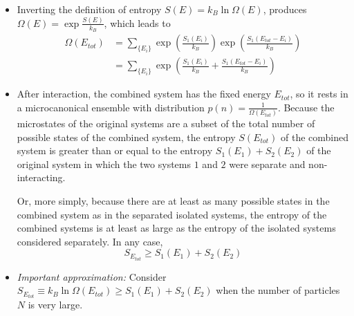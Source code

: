 \documentclass[11pt, a4paper]{article}
\begin{document}
\begin{itemize}
	\item Inverting the definition of entropy $ S(E) = k_{B}\ln \Omega(E) $, produces $ \Omega(E) = \exp \frac{S(E)}{k_{B}} $, which leads to 
	\begin{align*}
		\Omega(E_{tot}) &= \sum_{\{E_{i}\}} \exp(\frac{S_{1}(E_{i})}{k_{B}}) \exp(\frac{S_{1}(E_{tot} - E_{i})}{k_{B}}) \\
		& = \sum_{\{E_{i}\}} \exp(\frac{S_{1}(E_{i})}{k_{B}} + \frac{S_{1}(E_{tot} - E_{i})}{k_{B}})
	\end{align*}
	

	
	\item After interaction, the combined system has the fixed energy $ E_{tot} $, so it rests in a microcanonical ensemble with distribution $ p(n) = \frac{1}{\Omega(E_{tot})}$. Because the microstates of the original systems are a subset of the total number of possible states of the combined system, the entropy $ S(E_{tot}) $ of the combined system is greater than or equal to the entropy $ S_{1}(E_{1}) + S_{2}(E_{2}) $ of the original system in which the two systems $ 1 $ and $ 2 $ were separate and non-interacting.

	Or, more simply, because there are at least as many possible states in the combined system as in the separated isolated systems, the entropy of the combined systems is at least as large as the entropy of the isolated systems considered separately. In any case,
	\begin{equation*}
		S_{E_{tot}} \geq S_{1}(E_{1}) + S_{2}(E_{2})
	\end{equation*}
	
	\item \textit{Important approximation:} Consider $ S_{E_{tot}} \equiv k_{B}\ln \Omega(E_{tot}) \geq S_{1}(E_{1}) + S_{2}(E_{2}) $ when the number of particles $ N $ is very large. 
	

\end{itemize}
\end{document}
